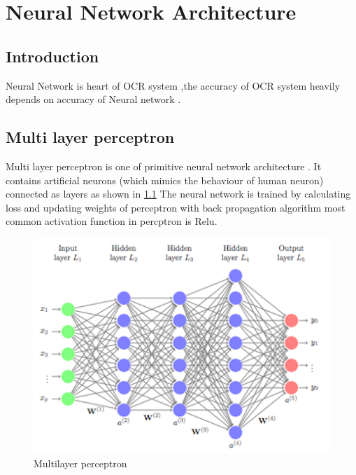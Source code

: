 
\chapter{Neural Network Architecture} %

\label{Chapter3} %


\section{Introduction} 

Neural Network is heart of OCR system ,the accuracy of OCR system heavily depends on accuracy of Neural
network . 

\section{Multi layer perceptron }

Multi layer perceptron is one of primitive neural network architecture . It contains artificial neurons
(which mimics the behaviour of human neuron) connected as layers as shown in \ref{fig:feed} The neural
network is trained by calculating loss and updating weights of perceptron  with back propagation algorithm 
most common activation function in percptron is Relu.


\begin{figure}[h]
\centering
\includegraphics[width=15cm]{Figures/deep_nn.png}
\caption{Multilayer perceptron }
\label{fig:feed}
\end{figure}



